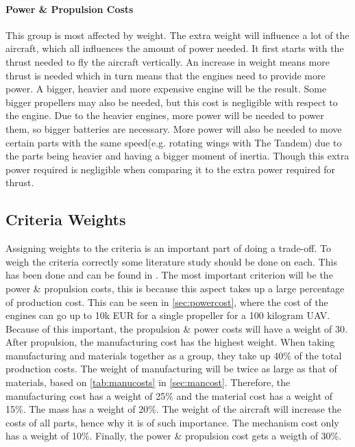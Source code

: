 \paragraph{Power \& Propulsion Costs} This group is most affected by weight. The extra weight will influence a lot of the aircraft, which all influences the amount of power  needed. It first starts with the thrust needed to fly the aircraft vertically. An increase in weight means more thrust is needed which in turn means that the engines need to provide more power. A bigger, heavier and more expensive engine will be the result. Some bigger propellers may also be needed, but this cost is negligible with respect to the engine. Due to the heavier engines, more power will be needed to power them, so bigger batteries are necessary. More power will also be needed to move certain parts with the same speed(e.g. rotating wings with The Tandem) due to the parts being heavier and having a bigger moment of inertia. Though this extra power required is negligible when comparing it to the extra power required for thrust.


\subsection{Criteria Weights}
\label{subsec:critweightcost}

Assigning weights to the criteria is an important part of doing a trade-off. To weigh the criteria correctly some literature study should be done on each. This has been done and can be found in . The most important criterion will be the power \& propulsion costs, this is because this aspect takes up a large percentage of production cost. This can be seen in \autoref{sec:powercost}, where the cost of the engines can go up to 10k EUR for a single propeller for a 100 kilogram UAV. Because of this important, the propulsion \& power costs will have a weight of 30. After propulsion, the manufacturing cost has the highest weight. When taking manufacturing and materials together as a group, they take up 40\% of the total production costs. The weight of manufacturing will be twice as large as that of materials, based on \autoref{tab:manucosts} in \autoref{sec:mancost}. Therefore, the manufacturing cost has a weight of 25\% and the material cost has a weight of 15\%. The mass has a weight of 20\%. The weight of the aircraft will increase the costs of all parts, hence why it is of such importance. The mechanism cost only has a weight of 10\%. Finally, the power \& propulsion cost gets a weigth of 30\%.


